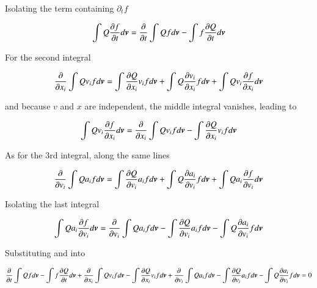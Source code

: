 \noindent Isolating the term containing $\partial_t f$

\begin{equation}
\int Q \frac{\partial f}{\partial t} d{\boldsymbol{v}}  = \frac{\partial }{\partial t}  \int Q f d{\boldsymbol{v}}  - \int f \frac{\partial Q}{\partial t} d{\boldsymbol{v}}  
\label{eq:eq2-cons}
\end{equation}

For the second integral 

\begin{equation}
\frac{\partial}{\partial x_i}\int Q v_i f  d{\boldsymbol{v}}  = \int \frac{\partial Q}{\partial x_i} v_i f  d{\boldsymbol{v}} + \int Q \frac{\partial v_i}{\partial x_i} f  d{\boldsymbol{v}} + \int Q v_i \frac{\partial f}{\partial x_i}  d{\boldsymbol{v}}  
\end{equation}

\noindent and because $v$ and $x$ are independent, the middle integral vanishes, leading to


\begin{equation}
\int Q v_i \frac{\partial f}{\partial x_i}  d{\boldsymbol{v}} =
\frac{\partial}{\partial x_i}\int Q v_i f  d{\boldsymbol{v}}   -\int \frac{\partial
  Q}{\partial x_i} v_i f  d{\boldsymbol{v}}  
\label{eq:eq3-cons}
\end{equation}

\noindent As for the 3rd integral, along the same lines 

\begin{equation}
\frac{\partial}{\partial v_i}\int Q a_i f  d{\boldsymbol{v}}  = \int \frac{\partial Q}{\partial v_i} a_i f  d{\boldsymbol{v}} + \int Q \frac{\partial a_i}{\partial v_i} f  d{\boldsymbol{v}} + \int Q a_i \frac{\partial f}{\partial v_i}  d{\boldsymbol{v}}  
\end{equation}

\noindent Isolating the last integral 

\begin{equation}
\int Q a_i \frac{\partial f}{\partial v_i}  d{\boldsymbol{v}}   = \frac{\partial}{\partial v_i}\int Q a_i f  d{\boldsymbol{v}}  - \int \frac{\partial Q}{\partial v_i} a_i f  d{\boldsymbol{v}} - \int Q \frac{\partial a_i}{\partial v_i} f  d{\boldsymbol{v}} 
\label{eq:eq4-cons}
\end{equation}


\noindent Substituting  and
 into 


\begin{equation}
\frac{\partial }{\partial t}  \int Q f d{\boldsymbol{v}}   - \int f \frac{\partial Q}{\partial t} d{\boldsymbol{v}} +  \frac{\partial}{\partial x_i}\int Q v_i f  d{\boldsymbol{v}}   -\int \frac{\partial Q}{\partial x_i} v_i f  d{\boldsymbol{v}} + \frac{\partial}{\partial v_i}\int Q a_i f  d{\boldsymbol{v}}  - \int \frac{\partial Q}{\partial v_i} a_i f  d{\boldsymbol{v}} - \int Q \frac{\partial a_i}{\partial v_i} f  d{\boldsymbol{v}} = 0  
\label{eq:eq5-cons}
\end{equation}

